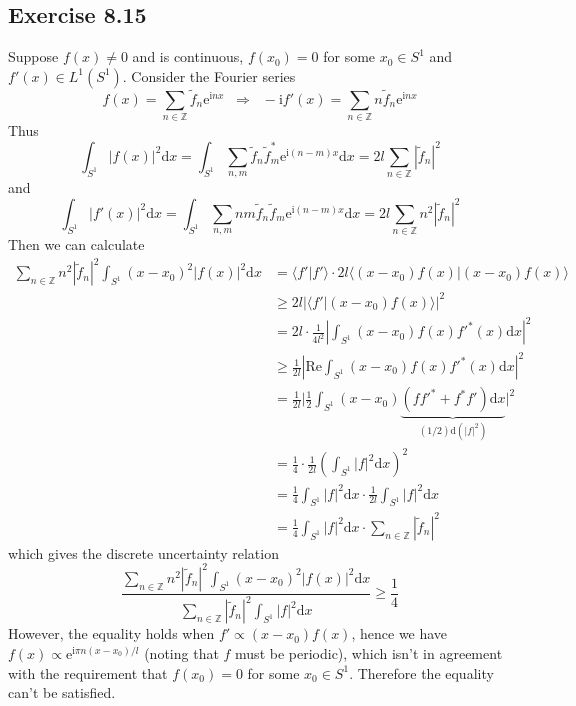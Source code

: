 \documentclass[]{ctexart}
\begin{document}
\subsection{Exercise 8.15}
Suppose $f(x)\ne 0$ and is continuous, $f(x_0)=0$ for some $x_0\in S^1$ and $f'(x)\in L^1(S^1)$. Consider the Fourier series 
\begin{equation*}
f(x)=\sum_{n\in\mathbb Z}\tilde{f}_n\mathrm{e}^{\mathrm{i}nx}\;\;\Rightarrow\;\;-\mathrm{i}f'(x)=\sum_{n\in\mathbb Z}n\tilde{f}_n\mathrm{e}^{\mathrm{i}nx}
\end{equation*}
Thus 
\begin{equation*}
\int_{S^1}|f(x)|^2\mathrm{d}x=\int_{S^1}\sum_{n,m}\tilde{f}_n\tilde{f}_m^*\mathrm{e}^{\mathrm{i}(n-m)x}\mathrm{d}x=2l\sum_{n\in\mathbb Z}|\tilde{f}_n|^2
\end{equation*}
and 
\begin{equation*}
\int_{S^1}|f'(x)|^2\mathrm{d}x=\int_{S^1}\sum_{n,m}nm\tilde{f}_n\tilde{f}_m\mathrm{e}^{\mathrm{i}(n-m)x}\mathrm{d}x=2l\sum_{n\in\mathbb Z}n^2|\tilde{f}_n|^2
\end{equation*}
Then we can calculate 
\begin{align*}
\sum_{n\in\mathbb Z}n^2|\tilde{f}_n|^2\int_{S^1}(x-x_0)^2|f(x)|^2\mathrm{d}x&=\langle f'|f'\rangle\cdot 2l\langle(x-x_0)f(x)|(x-x_0)f(x)\rangle\\
&\ge 2l|\langle f'|(x-x_0)f(x)\rangle|^2\\
&=2l\cdot\frac{1}{4l^2}\left|\int_{S^1}(x-x_0)f(x)f'^*(x)\mathrm{d}x\right|^2\\
&\ge\frac{1}{2l}\left|\text{Re}\int_{S^1}(x-x_0)f(x)f'^*(x)\mathrm{d}x\right|^2\\
&=\frac{1}{2l}\bigg|\frac{1}{2}\int_{S^1}(x-x_0)\underbrace{(ff'^*+f^*f')\mathrm{d}x}_{(1/2)\mathrm{d}(|f|^2)}\bigg|^2\\
&=\frac{1}{4}\cdot\frac{1}{2l}\left(\int_{S^1}|f|^2\mathrm{d}x\right)^2\\
&=\frac{1}{4}\int_{S^1}|f|^2\mathrm{d}x\cdot\frac{1}{2l}\int_{S^1}|f|^2\mathrm{d}x\\
&=\frac{1}{4}\int_{S^1}|f|^2\mathrm{d}x\cdot\sum_{n\in\mathbb Z}|\tilde{f}_n|^2
\end{align*}
which gives the discrete uncertainty relation 
\begin{equation*}
\frac{\sum_{n\in\mathbb Z}n^2|\tilde{f}_n|^2\int_{S^1}(x-x_0)^2|f(x)|^2\mathrm{d}x}{\sum_{n\in\mathbb Z}|\tilde{f}_n|^2\int_{S^1}|f|^2\mathrm{d}x}\ge\frac{1}{4}
\end{equation*}
However, the equality holds when $f'\propto(x-x_0)f(x)$, hence we have $f(x)\propto\mathrm{e}^{\mathrm{i}\pi n(x-x_0)/l}$ (noting that $f$ must be 
periodic), which isn't in agreement with the requirement that $f(x_0)=0$ for some $x_0\in S^1$. Therefore the equality can't be satisfied. 
\end{document}
